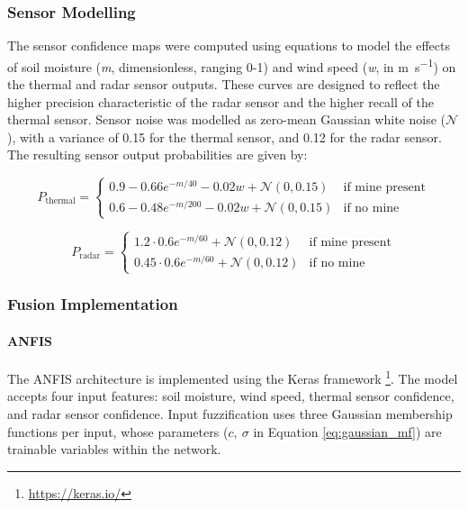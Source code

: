 \subsubsection{Sensor Modelling}  

    The sensor confidence maps were computed using equations to model the effects of soil moisture (\textit{m}, dimensionless, ranging 0-1) and wind speed (\textit{w}, in \si{\metre\per\second}) on the thermal and radar sensor outputs. These curves are designed to reflect the higher precision characteristic of the radar sensor and the higher recall of the thermal sensor. Sensor noise was modelled as zero-mean Gaussian white noise ($\mathcal{N}$), with a variance of 0.15 for the thermal sensor, and 0.12 for the radar sensor. The resulting sensor output probabilities are given by:
    
    \begin{equation}
        P_{\text{thermal}} = \begin{cases} 
        0.9 - 0.66e^{-m/40} - 0.02w + \mathcal{N}(0,0.15) & \text{if mine present} \\
        0.6 - 0.48e^{-m/200} - 0.02w + \mathcal{N}(0,0.15) & \text{if no mine}
        \end{cases}
    \end{equation}
    
    \begin{equation}
        P_{\text{radar}} = \begin{cases}
        1.2 \cdot 0.6e^{-m/60} + \mathcal{N}(0,0.12) & \text{if mine present} \\
        0.45 \cdot 0.6e^{-m/60} + \mathcal{N}(0,0.12) & \text{if no mine}
        \end{cases}
    \end{equation}

\subsubsection{Fusion Implementation}

    \paragraph{ANFIS} The ANFIS architecture is implemented using the Keras framework \footnote{\url{https://keras.io/}}. The model accepts four input features: soil moisture, wind speed, thermal sensor confidence, and radar sensor confidence. Input fuzzification uses three Gaussian membership functions per input, whose parameters ($c,~\sigma$ in Equation \ref{eq:gaussian_mf}) are trainable variables within the network.


